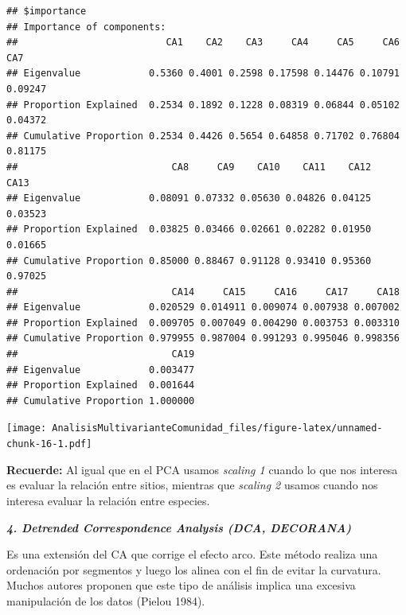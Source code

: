 \documentclass[]{book}
\newenvironment{Shaded}{\begin{snugshade}}{\end{snugshade}}
\newcommand{\KeywordTok}[1]{\textcolor[rgb]{0.13,0.29,0.53}{\textbf{{#1}}}}
\newcommand{\DataTypeTok}[1]{\textcolor[rgb]{0.13,0.29,0.53}{{#1}}}
\newcommand{\DecValTok}[1]{\textcolor[rgb]{0.00,0.00,0.81}{{#1}}}
\newcommand{\StringTok}[1]{\textcolor[rgb]{0.31,0.60,0.02}{{#1}}}
\newcommand{\CommentTok}[1]{\textcolor[rgb]{0.56,0.35,0.01}{\textit{{#1}}}}
\newcommand{\NormalTok}[1]{{#1}}
\begin{document}
\begin{verbatim}
## $importance
## Importance of components:
##                          CA1    CA2    CA3     CA4     CA5     CA6     CA7
## Eigenvalue            0.5360 0.4001 0.2598 0.17598 0.14476 0.10791 0.09247
## Proportion Explained  0.2534 0.1892 0.1228 0.08319 0.06844 0.05102 0.04372
## Cumulative Proportion 0.2534 0.4426 0.5654 0.64858 0.71702 0.76804 0.81175
##                           CA8     CA9    CA10    CA11    CA12    CA13
## Eigenvalue            0.08091 0.07332 0.05630 0.04826 0.04125 0.03523
## Proportion Explained  0.03825 0.03466 0.02661 0.02282 0.01950 0.01665
## Cumulative Proportion 0.85000 0.88467 0.91128 0.93410 0.95360 0.97025
##                           CA14     CA15     CA16     CA17     CA18
## Eigenvalue            0.020529 0.014911 0.009074 0.007938 0.007002
## Proportion Explained  0.009705 0.007049 0.004290 0.003753 0.003310
## Cumulative Proportion 0.979955 0.987004 0.991293 0.995046 0.998356
##                           CA19
## Eigenvalue            0.003477
## Proportion Explained  0.001644
## Cumulative Proportion 1.000000
\end{verbatim}

\begin{Shaded}
\end{Shaded}

\texttt{[image: AnalisisMultivarianteComunidad\_files/figure-latex/unnamed-chunk-16-1.pdf]}

\textbf{Recuerde:} Al igual que en el PCA usamos \emph{scaling 1} cuando
lo que nos interesa es evaluar la relación entre sitios, mientras que
\emph{scaling 2} usamos cuando nos interesa evaluar la relación entre
especies.

\textbf{\emph{4. Detrended Correspondence Analysis (DCA, DECORANA)}}

Es una extensión del CA que corrige el efecto arco. Este método realiza
una ordenación por segmentos y luego los alinea con el fin de evitar la
curvatura. Muchos autores proponen que este tipo de análisis implica una
excesiva manipulación de los datos (Pielou 1984).
\end{document}
